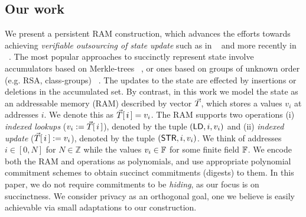\documentclass[11pt]{article}
\begin{document}
    \subsection{Our work}\label{subsec:ourwork}
    We present a persistent RAM construction, which advances the efforts
    towards achieving {\em verifiable outsourcing of state update} such as in ~\cite{EPRINT:BFRSBW13}
    and more recently in ~\cite{USENIX:OWWB20, CCS:CFHKKO22}. The most popular approaches to succinctly represent
    state involve accumulators based on Merkle-trees ~\cite{C:Merkle87}, or ones based on groups of unknown order
    (e.g. RSA, class-groups) ~\cite{C:CamLys02,C:BonBunFis19,USENIX:OWWB20, CCS:CFHKKO22}.
    The updates to the state are effected by insertions or deletions in the  accumulated set.
    By contrast, in this work we
    model the state as an addressable memory (RAM) described by vector $\vec{T}$, which stores a values $v_i$ at addresses $i$.
    We denote this as $\vec{T}[\,i\,]=v_i$. The RAM supports two operations (i) {\em indexed lookups} ($v_i := \vec{T}[\,i\,]$),
    denoted by the tuple $(\mathsf{LD}, i, v_i)$ and (ii) {\em indexed update} ($\vec{T}[\,i\,] := v_i$), denoted
    by the tuple $(\mathsf{STR}, i, v_i)$. We think of addresses $i\in [0,N]$ for $N\in \mathbb{Z}$ while the
    values $v_i\in \mathbb{F}$ for some finite field $\mathbb{F}$. We encode both the RAM and operations as polynomials, and
    use appropriate polynomial commitment schemes to obtain succinct commitments (digests) to them.
    In this paper, we do not require commitments to be {\em hiding}, as our focus is on succinctness.
    We consider privacy as an orthogonal goal, one we believe is easily achievable via small adaptations to our construction.
\end{document}
